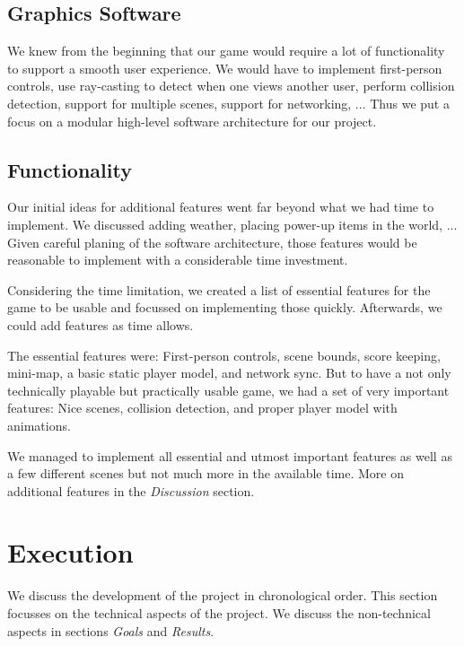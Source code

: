 \documentclass[11pt]{article}
\begin{document}
\subsection{Graphics Software}
\par We knew from the beginning that our game would require a lot of functionality to support a smooth user experience. We would have to implement first-person controls, use ray-casting to detect when one views another user, perform collision detection, support for multiple scenes, support for networking, ... Thus we put a focus on a modular high-level software architecture for our project.

\subsection{Functionality}
\par Our initial ideas for additional features went far beyond what we had time to implement. We discussed adding weather, placing power-up items in the world, ... Given careful planing of the software architecture, those features would be reasonable to implement with a considerable time investment.
\par Considering the time limitation, we created a list of essential features for the game to be usable and focussed on implementing those quickly. Afterwards, we could add features as time allows.
\par The essential features were: First-person controls, scene bounds, score keeping, mini-map, a basic static player model, and network sync. But to have a not only technically playable but practically usable game, we had a set of very important features: Nice scenes, collision detection, and proper player model with animations.
\par We managed to implement all essential and utmost important features as well as a few different scenes but not much more in the available time. More on additional features in the \textit{Discussion} section.





\section{Execution}
\par We discuss the development of the project in chronological order. This section focusses on the technical aspects of the project. We discuss the non-technical aspects in sections \textit{Goals} and \textit{Results}.
\end{document}
